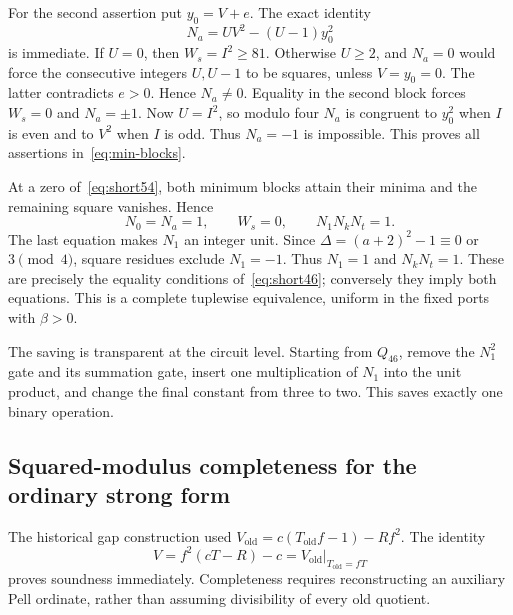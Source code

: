 For the second assertion put $y_0=V+e$. The exact identity
\[
 N_a=UV^2-(U-1)y_0^2
\]
is immediate. If $U=0$, then $W_s=I^2\geq81$. Otherwise $U\geq2$,
and $N_a=0$ would force the consecutive integers $U,U-1$ to be
squares, unless $V=y_0=0$. The latter contradicts $e>0$. Hence
$N_a\ne0$. Equality in the second block forces $W_s=0$ and
$N_a=\pm1$. Now $U=I^2$, so modulo four $N_a$ is congruent to
$y_0^2$ when $I$ is even and to $V^2$ when $I$ is odd. Thus $N_a=-1$
is impossible. This proves all assertions in~\eqref{eq:min-blocks}.

At a zero of~\eqref{eq:short54}, both minimum blocks attain their
minima and the remaining square vanishes. Hence
\[
 N_0=N_a=1,\qquad W_s=0,\qquad N_1N_kN_t=1.
\]
The last equation makes $N_1$ an integer unit. Since
$\Delta=(a+2)^2-1\equiv0$ or $3\pmod4$, square residues exclude
$N_1=-1$. Thus $N_1=1$ and $N_kN_t=1$. These are precisely the
equality conditions of~\eqref{eq:short46}; conversely they imply both
equations. This is a complete tuplewise equivalence, uniform in the
fixed ports with $\beta>0$.

The saving is transparent at the circuit level. Starting from $Q_{46}$,
remove the $N_1^2$ gate and its summation gate, insert one multiplication
of $N_1$ into the unit product, and change the final constant from three
to two. This saves exactly one binary operation.

\subsection{Squared-modulus completeness for the ordinary strong form}

The historical gap construction used
$V_{\mathrm{old}}=c(T_{\mathrm{old}}f-1)-Rf^2$.
The identity
\[
 V=f^2(cT-R)-c=V_{\mathrm{old}}\big|_{T_{\mathrm{old}}=fT}
\]
proves soundness immediately. Completeness requires reconstructing an
auxiliary Pell ordinate, rather than assuming divisibility of every
old quotient.

